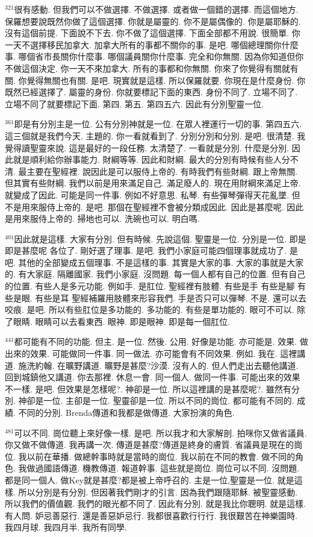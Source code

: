 \documentclass{book}
\begin{document}
$^{321}$很有感動.
但我們可以不做選擇.
不做選擇.
或者做一個錯的選擇.
而這個地方.
保羅想要說既然你做了這個選擇.
你就是屬靈的.
你不是屬偶像的.
你是屬耶穌的.
沒有這個前提.
下面說不下去.
你不做了這個選擇.
下面全部都不用說.
很簡單.
你一天不選擇移民加拿大.
加拿大所有的事都不關你的事.
是吧.
哪個總理關你什麼事.
哪個省市長關你什麼事.
哪個議員關你什麼事.
完全和你無關.
因為你知道但你不做這個決定.
你一天不來加拿大.
所有的事都和你無關.
你來了你覺得有關就有關.
你覺得無關也有關.
是吧.
現實就是這樣.
所以保羅就要.
你現在是什麼身份.
你既然已經選擇了.
屬靈的身份.
你就要標記下面的東西.
身份不同了.
立場不同了.
立場不同了就要標記下面.
第四.
第五.
第四五六.
因此有分別聖靈一位.

$^{361}$即是有分別主是一位.
公有分別神就是一位.
在眾人裡運行一切的事.
第四五六.
這三個就是我們今天.
主題的.
你一看就看到了.
分別分別和分別.
是吧.
很清楚.
我覺得讀聖靈來說.
這是最好的一段任務.
太清楚了.
一看就是分別.
什麼是分別.
因此就是順利給你辦事能力.
財綱等等.
因此和財綱.
最大的分別有時候有些人分不清.
最主要在聖經裡.
說因此是可以服侍上帝的.
有時我們有些財綱.
跟上帝無關.
但其實有些財綱.
我們以前是用來滿足自己.
滿足廢人的.
現在用財綱來滿足上帝.
就變成了因此.
可能是同一件事.
例如不好意思.
私琴.
有些彈琴彈得天花亂墜.
但不是用來服侍上帝的.
是吧.
那個在聖經裡不會被分類成因此.
因此是甚麼呢.
因此是用來服侍上帝的.
掃地也可以.
洗碗也可以.
明白嗎.

$^{401}$因此就是這樣.
大家有分別.
但有時候.
先說這個.
聖靈是一位.
分別是一位.
即是即是甚麼呢 各位了.
剛好選了理事.
是吧.
我們小家庭可能四個理事就成功了.
是吧.
其他的全部變成五個理事.
不是這樣的事.
其實是大家的事.
大家的事就是大家的.
有大家庭.
隔離國家.
我們小家庭.
沒問題.
每一個人都有自己的位置.
但有自己的位置.
有些人是多元功能.
例如手.
是肛位.
聖經裡有肢體.
有些是手 有些是腳 有些是眼.
有些是耳 聖經補羅用肢體來形容我們.
手是否只可以彈琴.
不是.
還可以去咬痕.
是吧.
所以有些肛位是多功能的.
多功能的.
有些是單功能的.
眼可不可以.
除了眼睛.
眼睛可以去看東西.
眼神.
即是眼神.
即是每一個肛位.

$^{441}$都可能有不同的功能.
但主.
是一位.
然後.
公用.
好像是功能.
亦可能是.
效果.
做出來的效果.
可能做同一件事.
同一做法.
亦可能會有不同效果.
例如.
我在.
這裡講道.
施洗約翰.
在曠野講道.
曠野是甚麼?沙漠.
沒有人的.
但人們走出去聽他講道.
回到城鎮他又講道.
你去那裡.
休息一會.
同一個人.
做同一件事.
可能出來的效果不一樣.
是吧.
但效果是怎樣呢?.
神卻是一位.
所以這裡講的是甚麼呢?.
雖然有分別.
神卻是一位.
主卻是一位.
聖靈卻是一位.
所以不同的崗位.
都可能有不同的.
成績.
不同的分別.
Brenda傳道和我都是做傳道.
大家扮演的角色.

$^{481}$可以不同.
崗位聽上來好像一樣.
是吧.
所以我才和大家解剖.
拍咪你又做省議員.
你又做不做傳道.
我再講一次.
傳道是甚麼?傳道是終身的膚質.
省議員是現在的崗位.
我以前在華播.
做總幹事時就是當時的崗位.
我以前在不同的教會.
做不同的角色.
我做過國語傳道.
機教傳道.
報道幹事.
這些就是崗位.
崗位可以不同.
沒問題.
都是同一個人.
做Key就是甚麼?都是被上帝呼召的.
主是一位,聖靈是一位.
就是這樣.
所以分別是有分別.
但因著我們剛才的引言.
因為我們跟隨耶穌.
被聖靈感動.
所以我們的價值觀.
我們的眼光都不同了.
因此有分別.
就是我比你聰明.
就是這樣.
有人問.
妒忌善惡行.
還是善惡妒忌行.
我都很喜歡行行行.
我很艱苦在神樂園時.
我四月球.
我四月半.
我所有同學.
\end{document}
